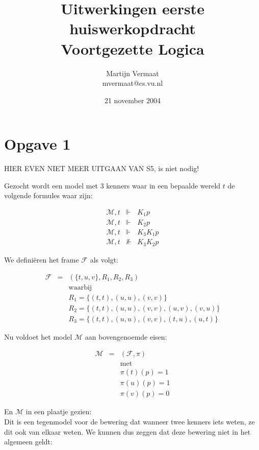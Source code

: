 \documentclass[a4paper,11pt]{article}
\title{Uitwerkingen eerste huiswerkopdracht\\Voortgezette Logica}
\author{
    Martijn Vermaat\\
    mvermaat@cs.vu.nl
}
\date{21 november 2004}
\begin{document}
\maketitle


\section*{Opgave 1}

HIER EVEN NIET MEER UITGAAN VAN S5, is niet nodig!

Gezocht wordt een model met 3 kenners waar in een bepaalde wereld
$t$ de volgende formules waar zijn:

\begin{eqnarray*}
\mathcal{M},t & \Vdash & K_{1} p        \\
\mathcal{M},t & \Vdash & K_{2} p        \\
\mathcal{M},t & \Vdash & K_{3} K_{1} p  \\
\mathcal{M},t & \nVdash & K_{3} K_{2} p
\end{eqnarray*}

We defini\"eren het frame $\mathcal{F}$ als volgt:

\begin{eqnarray*}
\mathcal{F} & = & (\{t,u,v\}, R_{1}, R_{2}, R_{3}) \\
& & \mbox{waarbij}                                 \\
& & R_{1} = \{(t,t), (u,u), (v,v)\}                \\
& & R_{2} = \{(t,t), (u,u), (v,v), (u,v), (v,u)\}  \\
& & R_{3} = \{(t,t), (u,u), (v,v), (t,u), (u,t)\}
\end{eqnarray*}

Nu voldoet het model $\mathcal{M}$ aan bovengenoemde eisen:

\begin{eqnarray*}
\mathcal{M} & = & (\mathcal{F}, \pi) \\
& & \mbox{met}                       \\
& & \pi(t)(p) = 1                    \\
& & \pi(u)(p) = 1                    \\
& & \pi(v)(p) = 0
\end{eqnarray*}

En $\mathcal{M}$ in een plaatje gezien:\\[1em]



Dit is een tegenmodel voor de bewering dat wanneer twee kenners iets
weten, ze dit ook van elkaar weten. We kunnen dus zeggen dat deze
bewering niet in het algemeen geldt:
\end{document}
